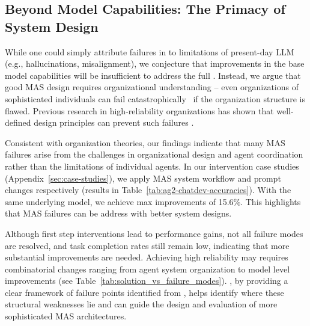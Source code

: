 \subsection{Beyond Model Capabilities: The Primacy of System Design}
\label{sec:system-design-matters}
While one could simply attribute failures in \dataset{} to limitations of present-day LLM (e.g., hallucinations, misalignment), we conjecture that improvements in the base model capabilities will be insufficient to address the full \taxnomony.  
Instead, we argue that good MAS design requires organizational understanding -- even organizations of sophisticated individuals can fail catastrophically~\citep{perrow1984normal} if the organization structure is flawed. Previous research in high-reliability organizations has shown that well-defined design principles can prevent such failures \cite{roberts1989high, ctx26792789720006532}. 

Consistent with organization theories, our findings indicate that many MAS failures arise from the challenges in organizational design and agent coordination rather than the limitations of individual agents. In our intervention case studies (Appendix~\ref{sec:case-studies}), we apply MAS system workflow and prompt changes respectively (results in Table~\ref{tab:ag2-chatdev-accuracies}). With the same underlying model, we achieve max improvements of 15.6\%. This highlights that MAS failures can be address with better system designs.

Although first step interventions lead to performance gains, not all failure modes are resolved, and task completion rates still remain low, indicating that more substantial improvements are needed. Achieving high reliability may requires combinatorial changes ranging from agent system organization to model level improvements (see Table~\ref{tab:solution_vs_failure_modes}). \taxonomy{}, by providing a clear framework of failure points identified from \dataset{}, helps identify where these structural weaknesses lie and can guide the design and evaluation of more sophisticated MAS architectures.

